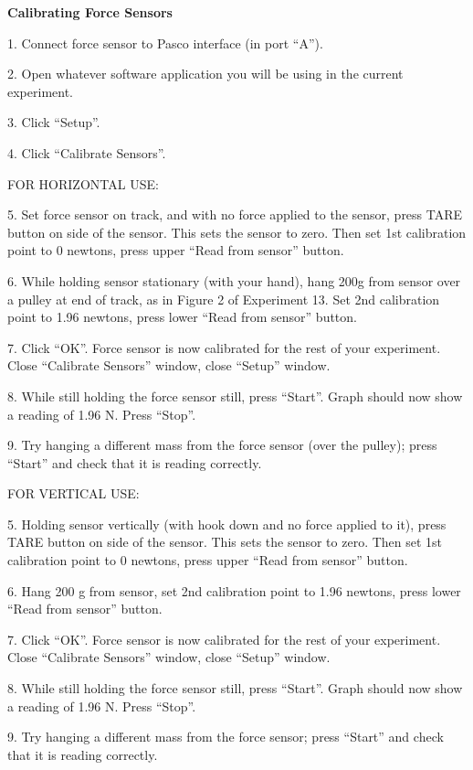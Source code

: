 \newpage

\textbf{Calibrating Force Sensors}

1. Connect force sensor to Pasco interface (in port ``A'').

2. Open whatever software application you will be using in the current experiment.

3. Click ``Setup''.

4. Click ``Calibrate Sensors''.

FOR HORIZONTAL USE:

5. Set force sensor on track, and with no force applied to the sensor, press TARE button on side of the sensor. This sets the sensor to zero. Then set 1st calibration point to 0 newtons, press upper ``Read from sensor'' button.

6. While holding sensor stationary (with your hand), hang 200g from sensor over a pulley at end of track, as in Figure 2 of Experiment 13. Set 2nd calibration point to 1.96 newtons, press lower ``Read from sensor'' button.

7. Click ``OK''. Force sensor is now calibrated for the rest of your experiment. Close ``Calibrate Sensors'' window, close ``Setup'' window.

8. While still holding the force sensor still, press ``Start''. Graph should now show a reading of 1.96 N. Press ``Stop''.

9. Try hanging a different mass from the force sensor (over the pulley); press ``Start'' and check that it is reading correctly.

FOR VERTICAL USE:

5. Holding sensor vertically (with hook down and no force applied to it), press TARE button on side of the sensor. This sets the sensor to zero. Then set 1st calibration point to 0 newtons, press upper ``Read from sensor'' button.

6. Hang 200 g from sensor, set 2nd calibration point to 1.96 newtons, press lower ``Read from sensor'' button.

7. Click ``OK''. Force sensor is now calibrated for the rest of your experiment. Close ``Calibrate Sensors'' window, close ``Setup'' window.

8. While still holding the force sensor still, press ``Start''. Graph should now show a reading of 1.96 N. Press ``Stop''.

9. Try hanging a different mass from the force sensor; press ``Start'' and check that it is reading correctly.


